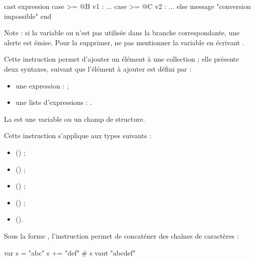 \begin{galgascode}
cast expression
case >= @B v1 :
  ...
case >= @C v2 :
  ...
else
  message "conversion impossible"
end
\end{galgascode}

Note : si la variable  ou   n'est pas utilisée dans la branche correspondante, une alerte est émise. Pour la supprimer, ne pas mentionner la variable en écrivant .










Cette instruction permet d'ajouter un élément à une collection ; elle présente deux syntaxes, suivant que l'élément à ajouter est défini par :
\begin{itemize}
  \item une expression :  ;
  \item une liste d'expressions : .
\end{itemize}


La  est une variable ou un champ de structure.

Cette instruction s'applique aux types suivants :
\begin{itemize}
  \item {} () ;
  \item {} () ;
  \item {} () ;
  \item {} () ;
  \item {} ().
\end{itemize}



Sous la forme , l'instruction permet de concaténer des chaînes de caractères :
\begin{galgascode}
var s = "abc"
s += "def" # s vaut "abcdef"
\end{galgascode}

